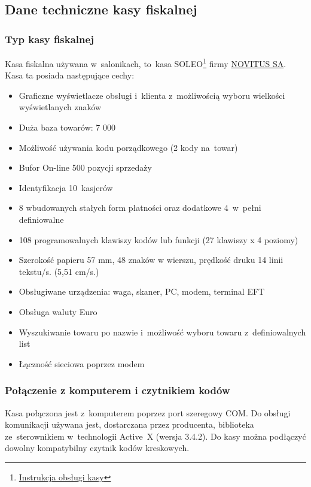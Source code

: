 \subsection{Dane techniczne kasy fiskalnej}

\subsubsection{Typ kasy fiskalnej}
\begin{description}

\item Kasa fiskalna używana w~salonikach, to~kasa SOLEO\footnote{\href{http://www.novitus.pl/pl/cok/download/instrukcje-obslugi/instr_obslugi_soleo_v18.pdf} {Instrukcja obsługi kasy}}  firmy \href{http://www.novitus.pl/pl} {NOVITUS SA}. Kasa ta posiada następujące cechy:	
\begin{itemize}
\item Graficzne wyświetlacze obsługi i~klienta z~możliwością wyboru wielkości wyświetlanych znaków
\item Duża baza towarów: 7 000
\item Możliwość używania kodu porządkowego (2 kody na~towar)
\item Bufor On-line 500 pozycji sprzedaży
\item Identyfikacja 10~kasjerów
\item 8 wbudowanych stałych form płatności oraz dodatkowe 4~w~pełni definiowalne
\item 108 programowalnych klawiszy kodów lub funkcji (27 klawiszy x 4 poziomy)
\item Szerokość papieru 57 mm, 48 znaków w wierszu, prędkość druku 14 linii tekstu/s. (5,51 cm/s.)
\item Obsługiwane urządzenia: waga, skaner, PC, modem, terminal EFT
\item Obsługa waluty Euro
\item Wyszukiwanie towaru po nazwie i~możliwość wyboru towaru z~definiowalnych list
\item Łączność sieciowa poprzez modem
\end{itemize} 
\end{description}
\subsubsection{Połączenie z komputerem i czytnikiem kodów}
Kasa połączona jest z~komputerem poprzez port szeregowy COM. Do obsługi komunikacji używana jest, dostarczana przez producenta, biblioteka ze~sterownikiem w~technologii Active~X (wersja 3.4.2). Do kasy można podłączyć dowolny kompatybilny czytnik kodów kreskowych.
